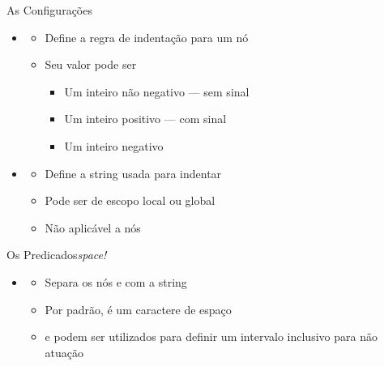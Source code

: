 \documentclass
  [ aspectratio=169,
    english,
    hyperref={citecolor=blue,colorlinks=true,linkcolor=blue,urlcolor=blue},
    brazil]
  {beamer}
\begin{document}

  \begin{frame}[fragile]{As Configurações}
    \begin{itemize}
      \item {}
            \begin{itemize}
              \item Define a regra de indentação para um nó
              \item Seu valor pode ser
                    \begin{itemize}
                      \item Um inteiro não negativo --- sem sinal
                      \item Um inteiro positivo --- com sinal
                      \item Um inteiro negativo
                    \end{itemize}
            \end{itemize}
      \item {}
            \begin{itemize}
              \item Define a string usada para indentar
              \item Pode ser de escopo local ou global
              \item Não aplicável a nós
            \end{itemize}
    \end{itemize}
  \end{frame}



  \begin{frame}[fragile]{Os Predicados}{\textit{space!}}
    \begin{itemize}
      \item {}
            \begin{itemize}
              \item Separa os nós  e 
                    com a string 
              \item Por padrão,  é um caractere de
                    espaço
              \item {} e  podem
                    ser utilizados para definir um intervalo inclusivo para não
                    atuação
            \end{itemize}
    \end{itemize}
  \end{frame}
\end{document}
